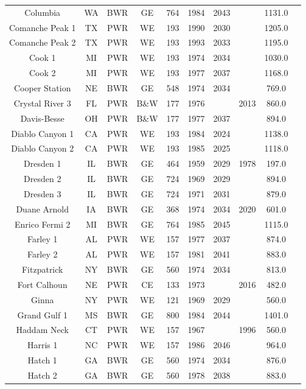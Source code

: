 \begin{table}[!h]
\begin{tabular}{c c c c c c c c c c}
    Columbia & WA & BWR & GE & 764 & 1984 & 2043 &  & 1131.0 \\
    Comanche Peak 1 & TX & PWR & WE & 193 & 1990 & 2030 &  & 1205.0 \\
    Comanche Peak 2 & TX & PWR & WE & 193 & 1993 & 2033 &  & 1195.0 \\
    Cook 1 & MI & PWR & WE & 193 & 1974 & 2034 &  & 1030.0 \\
    Cook 2 & MI & PWR & WE & 193 & 1977 & 2037 &  & 1168.0 \\
    Cooper Station & NE & BWR & GE & 548 & 1974 & 2034 &  & 769.0 \\
    Crystal River 3 & FL & PWR & B\&W & 177 & 1976 &  & 2013 & 860.0 \\
    Davis-Besse & OH & PWR & B\&W & 177 & 1977 & 2037 &  & 894.0 \\
    Diablo Canyon 1 & CA & PWR & WE & 193 & 1984 & 2024 &  & 1138.0 \\
    Diablo Canyon 2 & CA & PWR & WE & 193 & 1985 & 2025 &  & 1118.0 \\
    Dresden 1 & IL & BWR & GE & 464 & 1959 & 2029 & 1978 & 197.0 \\
    Dresden 2 & IL & BWR & GE & 724 & 1969 & 2029 &  & 894.0 \\
    Dresden 3 & IL & BWR & GE & 724 & 1971 & 2031 &  & 879.0 \\
    Duane Arnold & IA & BWR & GE & 368 & 1974 & 2034 & 2020 & 601.0 \\
    Enrico Fermi 2 & MI & BWR & GE & 764 & 1985 & 2045 &  & 1115.0 \\
    Farley 1 & AL & PWR & WE & 157 & 1977 & 2037 &  & 874.0 \\
    Farley 2 & AL & PWR & WE & 157 & 1981 & 2041 &  & 883.0 \\
    Fitzpatrick & NY & BWR & GE & 560 & 1974 & 2034 &  & 813.0 \\
    Fort Calhoun & NE & PWR & CE & 133 & 1973 &  & 2016 & 482.0 \\
    Ginna & NY & PWR & WE & 121 & 1969 & 2029 &  & 560.0 \\
    Grand Gulf 1 & MS & BWR & GE & 800 & 1984 & 2044 &  & 1401.0 \\
    Haddam Neck & CT & PWR & WE & 157 & 1967 &  & 1996 & 560.0 \\
    Harris 1 & NC & PWR & WE & 157 & 1986 & 2046 &  & 964.0 \\
    Hatch 1 & GA & BWR & GE & 560 & 1974 & 2034 &  & 876.0 \\
    Hatch 2 & GA & BWR & GE & 560 & 1978 & 2038 &  & 883.0 \\

\end{tabular}
\end{table}
